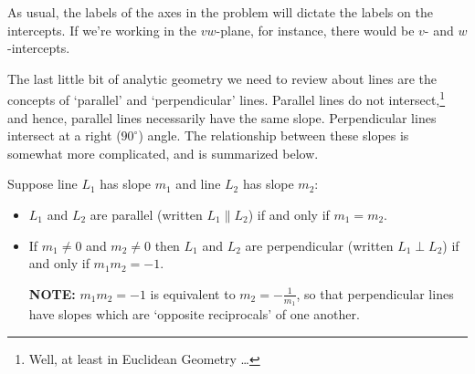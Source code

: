 \documentclass{ximera}
\begin{document}

 

As usual, the labels of the axes in the problem will dictate the labels on the intercepts.  If we're working in the $vw$-plane, for instance, there would be $v$- and $w$-intercepts.

 

The last little bit of analytic geometry we need to review about lines are the concepts of `parallel' and `perpendicular' lines.  Parallel lines do not intersect,\footnote{Well, at least in Euclidean Geometry \dots} and hence, parallel lines necessarily have the same slope.  Perpendicular lines intersect at a right ($90^{\circ}$) angle.   The relationship between these slopes is somewhat more complicated, and is summarized below.



% 

\begin{theorem}  Suppose line $L_1$ has slope $m_1$ and line $L_2$ has slope $m_2$:


\label{parallelperpendicularslopetheorem}


\begin{itemize}

\item $L_1$ and $L_2$ are parallel (written $L_1 \parallel L_2$) if and only if $m_1 = m_2$.

\item If $m_1 \neq 0$ and  $m_2 \neq 0$ then $L_1$ and $L_2$ are perpendicular (written $L_1 \perp L_2$) if and only if $m_1 m_2 = -1$.

\textbf{NOTE:} $m_1 m_2 = -1$  is equivalent to $m_2 = -\frac{1}{m_1}$, so that perpendicular lines have slopes which are `opposite reciprocals' of one another.

\end{itemize}

\end{theorem}

\end{document}
